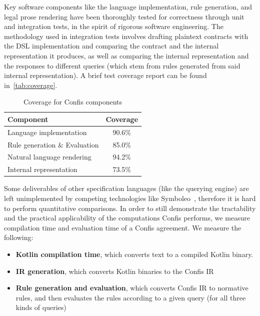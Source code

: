 Key software components like the language implementation, rule generation, and legal prose rendering have been thoroughly tested for correctness through unit and integration tests, in the spirit of rigorous software engineering.
The methodology used in integration tests involves drafting plaintext contracts with the DSL implementation and comparing the contract and the internal representation it produces, as well as comparing the internal representation and the responses to different queries (which stem from rules generated from said internal representation).
A brief test coverage report can be found in~\autoref{tab:coverage}.

\begin{table}[h]
    \centering
    \setlength{\tabcolsep}{8pt} %
    \renewcommand{\arraystretch}{1.2} %
    \begin{tabular}{l c}
        \textbf{Component}            & \textbf{Coverage} \\
        \hline
        Language implementation       & 90.6\%            \\
        Rule generation \& Evaluation & 85.0\%            \\
        Natural language rendering    & 94.2\%            \\
        Internal representation       & 73.5\%            \\
        \hline
    \end{tabular}
    \caption{Coverage for Confis components}
    \label{tab:coverage}
\end{table}

Some deliverables of other specification languages (like the querying engine) are left unimplemented by competing technologies like Symboleo~\cite{symboleo2020}, therefore it is hard to perform quantitative comparisons.
In order to still demonstrate the tractability and the practical applicability of the computations Confis performs, we measure compilation time and evaluation time of a Confis agreement.
We measure the following:
\begin{itemize}
    \item \textbf{Kotlin compilation time}, which converts text to a compiled Kotlin binary.
    \item \textbf{IR generation}, which converts Kotlin binaries to the Confis IR
    \item \textbf{Rule generation and evaluation}, which converts Confis IR to normative rules, and then evaluates the rules according to a given query (for all three kinds of queries)
\end{itemize}

